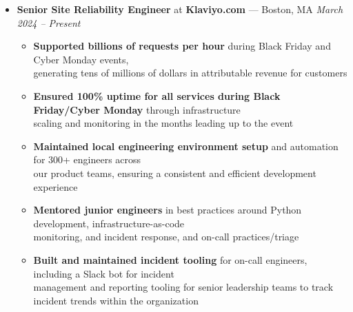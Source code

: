 \documentclass{article}
\begin{document}
\begin{itemize}[label={},leftmargin=*]

  \item \textbf{Senior Site Reliability Engineer} at \textbf{Klaviyo.com} --- Boston, MA \hfill {\em March 2024 -- Present}
  \begin{itemize}[label={$\bullet$}]
    \item \textbf{Supported billions of requests per hour} during Black Friday and Cyber Monday events,\\
          generating tens of millions of dollars in attributable revenue for customers
    \item \textbf{Ensured 100\% uptime for all services during Black Friday/Cyber Monday} through infrastructure\\
          scaling and monitoring in the months leading up to the event
    \item \textbf{Maintained local engineering environment setup} and automation for 300+ engineers across\\
          our product teams, ensuring a consistent and efficient development experience
    \item \textbf{Mentored junior engineers} in best practices around Python development, infrastructure-as-code\\
          monitoring, and incident response, and on-call practices/triage
    \item \textbf{Built and maintained incident tooling} for on-call engineers, including a Slack bot for incident\\
          management and reporting tooling for senior leadership teams to track incident trends within the organization
  \end{itemize}


\end{itemize}
\end{document}
